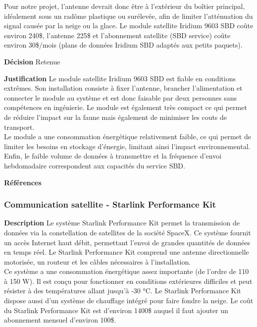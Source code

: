 Pour notre projet, l’antenne devrait donc être à l’extérieur du boîtier principal, idéalement sous un radôme plastique ou surélevée, afin de limiter l’atténuation du signal causée par la neige ou la glace. Le module satellite Iridium 9603 SBD coûte environ 240\$, l’antenne 225\$ et l’abonnement satellite (SBD service) coûte environ 30\$/mois (plans de données Iridium SBD adaptés aux petits paquets).
\smallskip

\noindent\textbf{Décision} Retenue
\smallskip

\noindent\textbf{Justification} Le module satellite Iridium 9603 SBD est fiable en conditions extrêmes. Son installation consiste à fixer l’antenne, brancher l’alimentation et connecter le module au système et est donc faisable par deux personnes sans compétences en ingénierie. Le module est également très compact ce qui permet de réduire l’impact sur la faune mais également de minimiser les couts de transport. \\

Le module a une consommation énergétique relativement faible, ce qui permet de limiter les besoins en stockage d’énergie, limitant ainsi l’impact environnemental. Enfin, le faible volume de données à transmettre et la fréquence d’envoi hebdomadaire correspondent aux capacités du service SBD.
\smallskip

\noindent\textbf{Références}
\cite{Satellite1}
\cite{Satellite2}
\cite{Satellite3}
\cite{Satellite4}

\subsubsection{Communication satellite - Starlink Performance Kit}
\label{sec:starl}
\noindent\textbf{Description} Le système Starlink Performance Kit permet la transmission de données via la constellation de satellites de la société SpaceX. Ce système fournit un accès Internet haut débit, permettant l’envoi de grandes quantités de données en temps réel. Le Starlink Performance Kit comprend une antenne directionnelle motorisée, un routeur et les câbles nécessaires à l’installation. \\

Ce système a une consommation énergétique assez importante (de l’ordre de 110 à 150 W). Il est conçu pour fonctionner en conditions extérieures difficiles et peut résister à des températures allant jusqu’à -30 °C. Le Starlink Performance Kit dispose aussi d’un système de chauffage intégré pour faire fondre la neige. Le coût du Starlink Performance Kit est d’environ 1400\$ auquel il faut ajouter un abonnement mensuel d’environ 100\$.
\smallskip

